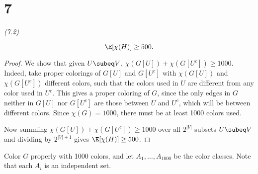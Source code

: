 \section{7}
\begin{problem} {\it (7.2)}
\begin{lem}
\[\E[\chi(H)]\ge 500.\]
\end{lem}
\begin{proof}
We show that given $U\subeq V$, $\chi(G[U])+\chi(G[U^c])\ge 1000$. Indeed, take proper colorings of $G[U]$ and $G[U^c]$ with $\chi(G[U])$ and $\chi(G[U^c])$ different colors, such that the colors used in $U$ are different from any color used in $U^c$. This gives a proper coloring of $G$, since the only edges in $G$ neither in $G[U]$ nor $G[U^c]$ are those between $U$ and $U^c$, which will be between different colors. Since $\chi(G)=1000$, there must be at least 1000 colors used.

Now summing $\chi(G[U])+\chi(G[U^c])\ge 1000$ over all $2^{|V|}$ subsets $U\subeq V$ and dividing by $2^{|V|+1}$ gives $\E[\chi(H)]\ge 500$.
\end{proof}

Color $G$ properly with 1000 colors, and let $A_1,\ldots, A_{1000}$ be the color classes. Note that each $A_i$ is an independent set. 


\end{problem}
